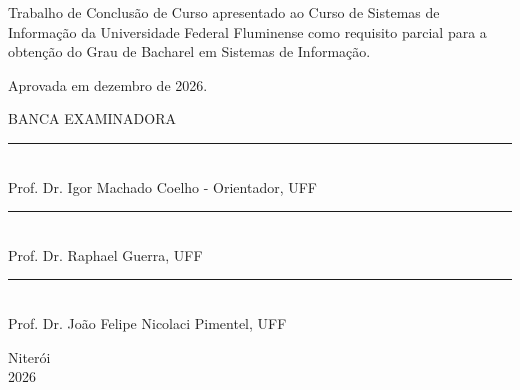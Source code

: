 \noindent
\begin{flushright}
\begin{minipage}[t]{8cm}

Trabalho de Conclusão de Curso apresentado ao Curso de Sistemas de Informação da Universidade Federal Fluminense como requisito parcial para a obtenção do Grau de Bacharel em Sistemas de Informação.

\end{minipage}
\end{flushright}
\vspace{1.0 cm}
\noindent
Aprovada em dezembro de 2026. \\
\begin{flushright}
  {
  \begin{center}
  BANCA EXAMINADORA \\
  \vspace{6mm}
  \rule{11cm}{.1mm} \\
    Prof. Dr. Igor Machado Coelho - Orientador, UFF \\
    \vspace{6mm}
  \rule{11cm}{.1mm} \\
    Prof. Dr. Raphael Guerra, UFF \\
    \vspace{6mm}
  \rule{11cm}{.1mm} \\
    Prof. Dr. João Felipe Nicolaci Pimentel, UFF \\
  \vspace{6mm}
  \end{center}
  }
\end{flushright}
\begin{center}
  \vspace{4mm}
  Niterói \\
  2026

\end{center}




